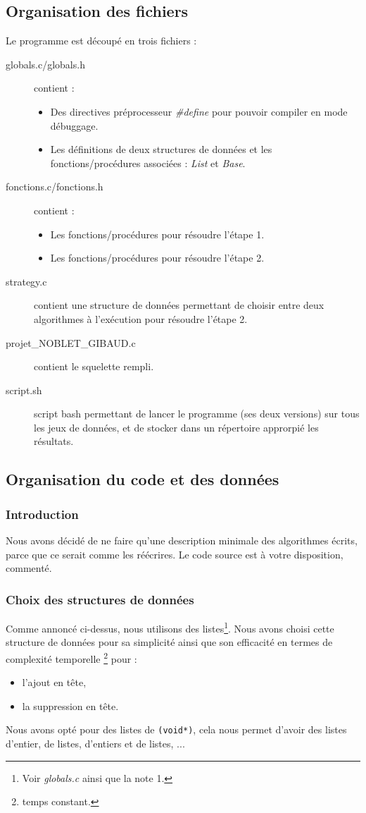 \documentclass[a4paper,10pt]{article}
\begin{document}
\subsection{Organisation des fichiers}
Le programme est découpé en trois fichiers :
\begin{description}
\item[globals.c/globals.h] contient :
  \begin{itemize}
  \item Des directives préprocesseur \emph{\#define} pour pouvoir compiler en mode débuggage.
  \item Les définitions de deux structures de données et les fonctions/procédures associées : \emph{List} et \emph{Base}.
  \end{itemize}
\item[fonctions.c/fonctions.h] contient :
  \begin{itemize}
  \item Les fonctions/procédures pour résoudre l'étape 1.
  \item Les fonctions/procédures pour résoudre l'étape 2.
  \end{itemize}
\item[strategy.c] contient une structure de données permettant de choisir entre deux algorithmes à l'exécution
  pour résoudre l'étape 2.
\item[projet\_NOBLET\_GIBAUD.c] contient le squelette rempli.
\item[script.sh] script bash permettant de lancer le programme (ses deux versions) sur tous les jeux de données, et
  de stocker dans un répertoire approrpié les résultats.
\end{description}
    
\subsection{Organisation du code et des données}

\subsubsection{Introduction}
Nous avons décidé de ne faire qu'une description minimale des algorithmes écrits,
parce que ce serait comme les réécrires.
Le code source est à votre disposition, commenté.

\subsubsection{Choix des structures de données}
Comme annoncé ci-dessus, nous utilisons des listes\footnote{Voir \emph{globals.c} ainsi que la note 1.}.
Nous avons choisi cette structure de données pour sa simplicité ainsi que son efficacité en termes de complexité temporelle
\footnote{temps constant.} pour :
\begin{itemize}
\item l'ajout en tête,
\item la suppression en tête.
\end{itemize}
Nous avons opté pour des listes de \verb+(void*)+, cela nous 
permet d'avoir des listes d'entier, de listes, d'entiers et de listes, ...
\end{document}

